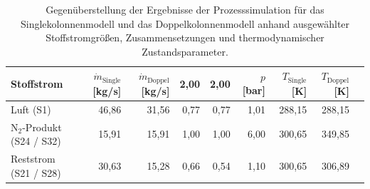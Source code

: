 \begin{longtable}{lrrrrrrrr}
\caption{Gegenüberstellung der Ergebnisse der Prozesssimulation für das Singlekolonnenmodell und das Doppelkolonnenmodell anhand ausgewählter Stoffstromgrößen, Zusammensetzungen und thermodynamischer Zustandsparameter.} \\
\hline
Stoffstrom & $\dot{m}_{\text{Single}}$ [kg/s] & $\dot{m}_{\text{Doppel}}$ [kg/s] & 2,00 & 2,00 & $p$ [bar] & $T_{\text{Single}}$ [K] & $T_{\text{Doppel}}$ [K] \\
\hline
Luft (S1) & 46,86 & 31,56 & 0,77 & 0,77 & 1,01 & 288,15 & 288,15 \\
N$_2$-Produkt (S24 / S32) & 15,91 & 15,91 & 1,00 & 1,00 & 6,00 & 300,65 & 349,85 \\
Reststrom (S21 / S28) & 30,63 & 15,28 & 0,66 & 0,54 & 1,10 & 300,65 & 306,89 \\
\hline
\end{longtable}
